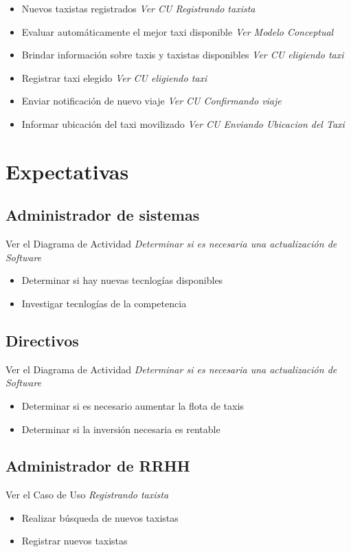 \documentclass[a4paper]{article}
\begin{document}
\begin{itemize}
\item Nuevos taxistas registrados \textit{Ver CU Registrando taxista}
\item Evaluar autom\'aticamente el mejor taxi disponible \textit{Ver Modelo Conceptual}
\item Brindar informaci\'on sobre taxis y taxistas disponibles \textit{Ver CU eligiendo taxi}
\item Registrar taxi elegido \textit{Ver CU eligiendo taxi}
\item Enviar notificaci\'on de nuevo viaje \textit{Ver CU Confirmando viaje}
\item Informar ubicaci\'on del taxi movilizado \textit{Ver CU Enviando Ubicacion del Taxi}

\end{itemize}


\section{Expectativas}


\subsection{Administrador de sistemas}
Ver el Diagrama de Actividad \textit{Determinar si es necesaria una actualizaci\'on de Software}
\begin{itemize}
 \item Determinar si hay nuevas tecnlog\'ias disponibles
 \item Investigar tecnlog\'ias de la competencia
 
\end{itemize}



\subsection{Directivos}
Ver el Diagrama de Actividad \textit{Determinar si es necesaria una actualizaci\'on de Software}
\begin{itemize}
 \item Determinar si es necesario aumentar la flota de taxis
 \item Determinar si la inversi\'on necesaria es rentable
\end{itemize}

\subsection{Administrador de RRHH}
Ver el Caso de Uso \textit{Registrando taxista}
\begin{itemize}
 \item Realizar b\'usqueda de nuevos taxistas
 \item Registrar nuevos taxistas
\end{itemize}
\end{document}
